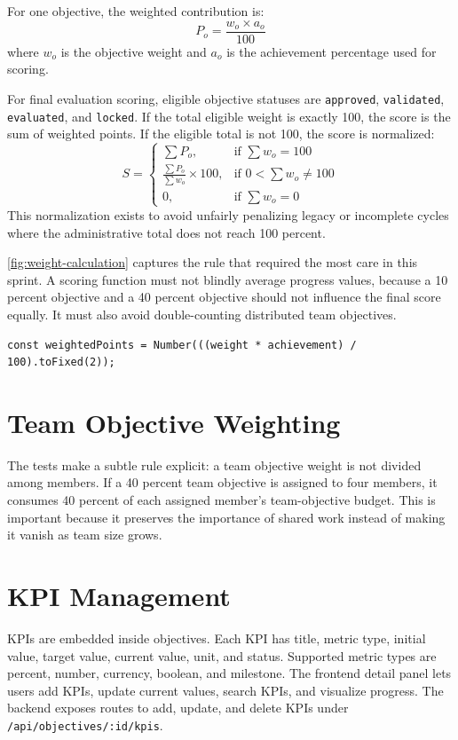 For one objective, the weighted contribution is:
\[
P_o = \frac{w_o \times a_o}{100}
\]
where \(w_o\) is the objective weight and \(a_o\) is the achievement percentage used for scoring.

For final evaluation scoring, eligible objective statuses are \texttt{approved}, \texttt{validated}, \texttt{evaluated}, and \texttt{locked}. If the total eligible weight is exactly 100, the score is the sum of weighted points. If the eligible total is not 100, the score is normalized:
\[
S =
\begin{cases}
\sum P_o, & \text{if } \sum w_o = 100\\
\frac{\sum P_o}{\sum w_o} \times 100, & \text{if } 0 < \sum w_o \neq 100\\
0, & \text{if } \sum w_o = 0
\end{cases}
\]
This normalization exists to avoid unfairly penalizing legacy or incomplete cycles where the administrative total does not reach 100 percent.



\cref{fig:weight-calculation} captures the rule that required the most care in this sprint. A scoring function must not blindly average progress values, because a 10 percent objective and a 40 percent objective should not influence the final score equally. It must also avoid double-counting distributed team objectives.

\begin{lstlisting}[caption={Core weighted-points rule from the scoring service.}]
const weightedPoints = Number(((weight * achievement) / 100).toFixed(2));
\end{lstlisting}

\section{Team Objective Weighting}
The tests make a subtle rule explicit: a team objective weight is not divided among members. If a 40 percent team objective is assigned to four members, it consumes 40 percent of each assigned member's team-objective budget. This is important because it preserves the importance of shared work instead of making it vanish as team size grows.



\section{KPI Management}
KPIs are embedded inside objectives. Each KPI has title, metric type, initial value, target value, current value, unit, and status. Supported metric types are percent, number, currency, boolean, and milestone. The frontend detail panel lets users add KPIs, update current values, search KPIs, and visualize progress. The backend exposes routes to add, update, and delete KPIs under \texttt{/api/objectives/:id/kpis}.

